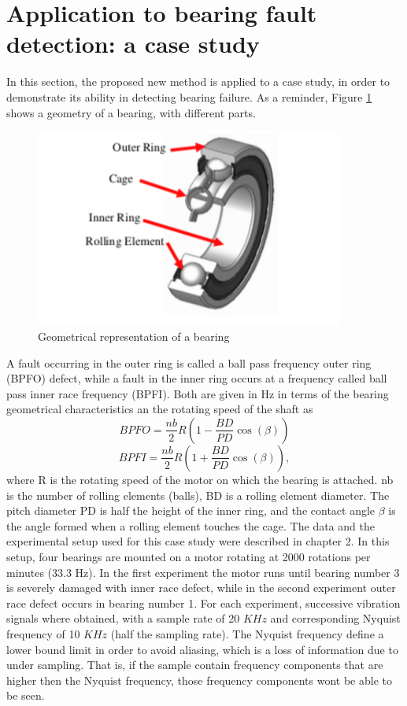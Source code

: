 \documentclass[../Main/thesis.tex]{subfiles}
\begin{document}
\section{Application to bearing fault detection: a case study}
\label{sec:pulse}
In this section, the proposed new method is applied to a case study, in order to demonstrate its ability in detecting bearing failure. As a reminder, Figure \ref{fig:bearing-architecture} shows a geometry of a bearing, with different parts.
\begin{figure}[H] %
   \centering
   \includegraphics[width=4in]{../fig/bearing.png} 
   \caption{Geometrical representation of a bearing}
   \label{fig:bearing-architecture}
\end{figure}
\justify
A fault occurring in the outer ring is called a ball pass frequency outer ring (BPFO) defect, while a fault in the inner ring occurs at a frequency called ball pass inner race frequency (BPFI). Both are given in Hz in terms of the bearing geometrical characteristics an the rotating speed of the shaft as
\begin{equation}\label{eq:bpfo2}
BPFO = \frac{nb}{2}R\left(1-\frac{BD}{PD}\cos\left(\beta\right)  \right) \nonumber
\end{equation}
\begin{equation}\label{eq:bpfi2}
BPFI = \frac{nb}{2}R\left( 1 +  \frac{BD}{PD}\cos\left(\beta\right)   \right),
\end{equation}
where R is the rotating speed of the motor on which the bearing is attached. nb is the number of rolling elements (balls), BD is a rolling element diameter. The pitch diameter PD is half the height of the inner ring, and the contact angle $\beta$ is the angle formed when a rolling element touches the cage. 
\justify
The data and the experimental setup used for this case study were described in chapter 2. In this setup, four bearings are mounted on a motor rotating at 2000 rotations per minutes (33.3 Hz). In the first experiment the motor runs until
bearing number 3 is severely damaged with inner race defect, while in the second experiment outer race defect occurs in bearing number 1. For each experiment, successive vibration signals where obtained, with a sample rate of 20 $KHz$ and corresponding Nyquist frequency of 10 $KHz$ (half the sampling rate). The Nyquist frequency define a lower bound limit in order to avoid aliasing, which is a loss of information due to under sampling. That is, if the sample contain frequency components that are higher then the Nyquist frequency, those frequency components wont be able to be seen.
\end{document}
